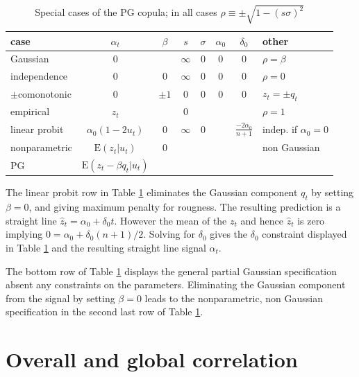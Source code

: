 \documentclass[authoryear]{elsarticle}
\newcommand{\E}{\mathrm{E}}
\newcommand{\tref}[1]{Table \ref{#1}}
\begin{document}
 \begin{table}[htdp]
\caption{Special cases of the PG copula; in all cases $\rho\equiv\pm\sqrt{1-(s\sigma)^2}$}\label{pg}
\begin{center}
\begin{tabular}{l|c|ccccc|l}
\hline
case& $\alpha_t$ & $\beta$ &$s$ & $\sigma$ & $\alpha_0$&$\delta_0$  & other\\
\hline
Gaussian & 0 &  & $\infty$ & $0$&  0&0 &$\rho=\beta$\\
independence &  0 & 0 & $\infty$&0 & 0 &0 &$\rho=0$\\
$\pm$comonotonic  & 0 &$\pm 1$ &0 & 0 &0 & 0 &$z_t=\pm q_t$  \\
empirical  & $z_t$ &  & $0$  &  &   &  &$\rho=1$ \\ 
linear probit &$\alpha_0(1-2u_t)$&  0 &  $\infty$ &0& & $\frac{-2\alpha_0}{n+1}$ &indep. if $\alpha_0=0$\\
nonparametric & $\E(z_t|u_t)$  & 0 & & & &  & non Gaussian \\
PG & $\E(z_t-\beta q_t|u_t)$ & & & & & &  \\
\hline
\end{tabular}
\end{center}
\end{table}%

The linear probit row in \tref{pg}  eliminates the Gaussian component $q_t$ by setting $\beta=0$, and giving maximum penalty for rougness.   The resulting prediction  is a straight line $\hat z_t=\alpha_0+\delta_0 t$.  However the mean of the $z_t$ and hence $\hat z_t$ is zero implying $0=\alpha_0 + \delta_0(n+1)/2$.   Solving for $\delta_0$ gives the $\delta_0$ constraint displayed in \tref{pg} and the resulting straight line signal $\alpha_t$.

The bottom row of \tref{pg} displays the general partial Gaussian specification absent  any constraints on the parameters.  Eliminating the Gaussian component from the signal by setting $\beta=0$ leads to the nonparametric, non Gaussian specification in the second last row of \tref{pg}.

\section{Overall and global correlation}
\end{document}

